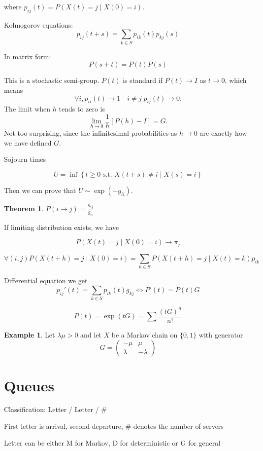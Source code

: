 \documentclass{article}
\theoremstyle{definition}
\newtheorem{exmp}{Example}[section]
\newtheorem{theorem}{Theorem}[section]
\begin{document}
where $p_{ij}(t) = P \left( X(t) = j \mid X(0) = i \right)$.

Kolmogorov equations:
$$
p_{ij}(t+s) = \sum_{k \in S} p_{ik}(t) p_{kj}(s)
$$

In matrix form:
$$
P(s+t) = P(t) P(s)
$$

This is a stochastic semi-group. $P(t)$ is standard if $P(t) \to I$ as $t \to 0$, which means 
$$
\forall i, p_{ii}(t) \to 1 \quad i \ne j \; p_{ij}(t) \to 0.
$$
The limit when $h$ tends to zero is
$$
\lim_{h\to 0} \frac{1}{h} \left[ P(h) - I \right] = G.
$$
Not too surprising, since the infinitesimal probabilities as $h \to 0$ are exactly how we have defined $G$.

Sojourn times 

$$
U = \inf \left\{ t \ge 0 \text{ s.t. } X(t+s) \ne i \mid X(s) = i \right\}
$$

Then we can prove that $U \sim \exp(-g_{ii})$.

\begin{theorem}
$P(i \to j) = \frac{g_{ij}}{g_{ii}}$
\end{theorem}

If limiting distribution exists, we have

$$
P(X(t) = j \mid X(0) = i) \to \pi_j
$$

$$
\forall (i,j)  P( X(t+h) = j \mid X(0) = i) = \sum_{k \in S} P(X(t+h) = j \mid X(t) = k) p_{ik}
$$

Differential equation we get
$$
p_{ij}'(t) = \sum_{k \in S} p_{ik}(t) g_{kj} \iff P'(t) = P(t) G
$$

$$
P(t) = \exp( tG ) = \sum \frac{(tG)^n}{n!}
$$

\begin{exmp}
Let $\lambda \mu > 0$ and let $X$ be a Markov chain on $\{0,1\}$ with generator 
$$
G = \begin{pmatrix}
-\mu & \mu \\
\lambda & -\lambda 
\end{pmatrix}
$$
\end{exmp}

\section{Queues}

Classification: Letter / Letter / \#

First letter is arrival, second departure, \# denotes the number of servers

Letter can be either M for Markov, D for deterministic or G for general
\end{document}
